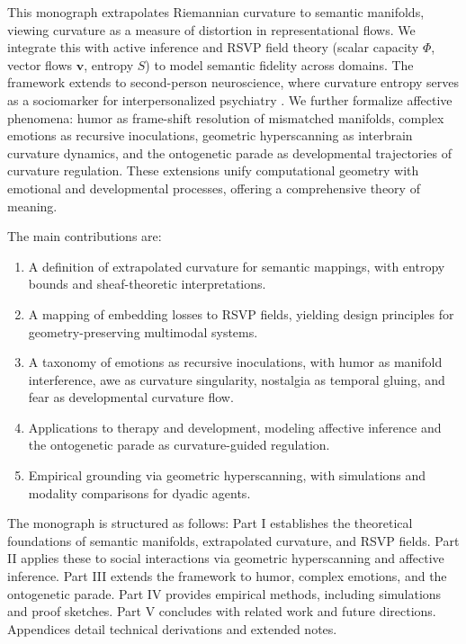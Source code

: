 \documentclass{article}
\theoremstyle{definition}
\begin{document}
This monograph extrapolates Riemannian curvature to semantic manifolds, viewing curvature as a measure of distortion in representational flows. We integrate this with active inference \cite{friston2017graphical} and RSVP field theory (scalar capacity $\Phi$, vector flows $\mathbf{v}$, entropy $S$) to model semantic fidelity across domains. The framework extends to second-person neuroscience, where curvature entropy serves as a sociomarker for interpersonalized psychiatry \cite{adel2025systematic}. We further formalize affective phenomena: humor as frame-shift resolution of mismatched manifolds, complex emotions as recursive inoculations, geometric hyperscanning as interbrain curvature dynamics, and the ontogenetic parade as developmental trajectories of curvature regulation. These extensions unify computational geometry with emotional and developmental processes, offering a comprehensive theory of meaning.

The main contributions are:
\begin{enumerate}
  \item A definition of extrapolated curvature for semantic mappings, with entropy bounds and sheaf-theoretic interpretations.
  \item A mapping of embedding losses to RSVP fields, yielding design principles for geometry-preserving multimodal systems.
  \item A taxonomy of emotions as recursive inoculations, with humor as manifold interference, awe as curvature singularity, nostalgia as temporal gluing, and fear as developmental curvature flow.
  \item Applications to therapy and development, modeling affective inference and the ontogenetic parade as curvature-guided regulation.
  \item Empirical grounding via geometric hyperscanning, with simulations and modality comparisons for dyadic agents.
\end{enumerate}

The monograph is structured as follows: Part I establishes the theoretical foundations of semantic manifolds, extrapolated curvature, and RSVP fields. Part II applies these to social interactions via geometric hyperscanning and affective inference. Part III extends the framework to humor, complex emotions, and the ontogenetic parade. Part IV provides empirical methods, including simulations and proof sketches. Part V concludes with related work and future directions. Appendices detail technical derivations and extended notes.
\end{document}
